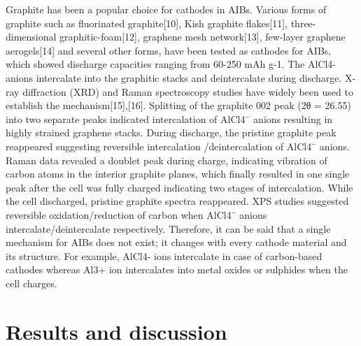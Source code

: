 \documentclass{article}
\begin{document}
Graphite has been a popular choice for cathodes in AIBs. Various forms of graphite such as fluorinated graphite[10], Kish graphite flakes[11], three-dimensional graphitic-foam[12], graphene mesh network[13], few-layer graphene aerogels[14] and several other forms, have been tested as cathodes for AIBs, which showed discharge capacities ranging from 60-250 mAh g-1. The AlCl4- anions intercalate into the graphitic stacks and deintercalate during discharge. X-ray diffraction (XRD) and Raman spectroscopy studies have widely been used to establish the mechanism[15],[16]. Splitting of the graphite 002 peak (2θ = 26.55) into two separate peaks indicated intercalation of AlCl4¯ anions resulting in highly strained graphene stacks.  During discharge, the pristine graphite peak reappeared suggesting reversible intercalation /deintercalation of AlCl4¯ anions. Raman data revealed a doublet peak during charge, indicating vibration of carbon atoms in the interior graphite planes, which finally resulted in one single peak after the cell was fully charged indicating two stages of intercalation. While the cell discharged, pristine graphite spectra reappeared. XPS studies suggested reversible oxidation/reduction of carbon when AlCl4¯ anions intercalate/deintercalate respectively. Therefore, it can be said that a single mechanism for AIBs does not exist; it changes with every cathode material and its structure. For example, AlCl4- ions intercalate in case of carbon-based cathodes whereas Al3+ ion intercalates into metal oxides or sulphides when the cell charges.

\section{Results and discussion}
\end{document}
